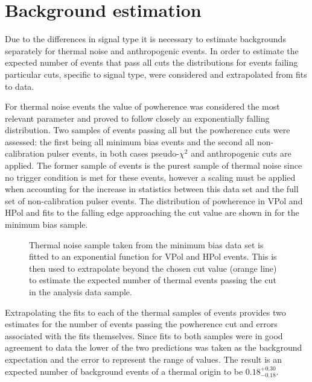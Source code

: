 \section{Background estimation}
\label{sec:Analysis:Background-Estimation}

Due to the differences in signal type it is necessary to estimate backgrounds separately for thermal noise and anthropogenic events. In order to estimate the expected number of events that pass all cuts the distributions for events failing particular cuts, specific to signal type, were considered and extrapolated from fits to data.

For thermal noise events the value of powherence was considered the most relevant parameter and proved to follow closely an exponentially falling distribution. Two samples of events passing all but the powherence cuts were assessed: the first being all minimum bias events and the second all non-calibration pulser events, in both cases pseudo-$\chi^{2}$ and anthropogenic cuts are applied. The former sample of events is the purest sample of thermal noise since no trigger condition is met for these events, however a scaling must be applied when accounting for the increase in statistics between this data set and the full set of non-calibration pulser events. The distribution of powherence in VPol and HPol and fits to the falling edge approaching the cut value are shown in  for the minimum bias sample. 

\begin{figure}[htpb]
\hfill
{}
\caption{Thermal noise sample taken from the minimum bias data set is fitted to an exponential function for VPol and HPol events. This is then used to extrapolate beyond the chosen cut value (orange line) to estimate the expected number of thermal events passing the cut in the analysis data sample.}
\label{fig:Analysis:Background-Estimation:Thermal-Background}
\end{figure}

Extrapolating the fits to each of the thermal samples of events provides two estimates for the number of events passing the powherence cut and errors associated with the fits themselves. Since fits to both samples were in good agreement to data the lower of the two predictions was taken as the background expectation and the error to represent the range of values. The result is an expected number of background events of a thermal origin to be $0.18^{+0.30}_{-0.18}$.

